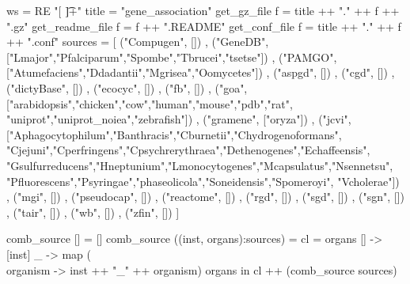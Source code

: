 \begin{code}
ws = RE "[ \t]+"
title = "gene_association"
get_gz_file f = title ++ "." ++ f ++ ".gz"
get_readme_file f = f ++ ".README"
get_conf_file f = title ++ "."  ++ f ++ ".conf"
\mbox{}
sources = [
	  ("Compugen", [])
	, ("GeneDB", ["Lmajor","Pfalciparum","Spombe","Tbrucei","tsetse"])
	, ("PAMGO", ["Atumefaciens","Ddadantii","Mgrisea","Oomycetes"])
	, ("aspgd", [])
	, ("cgd", [])
	, ("dictyBase", [])
	, ("ecocyc", [])
	, ("fb", [])
	, ("goa", ["arabidopsis","chicken","cow","human","mouse","pdb","rat",
                   "uniprot","uniprot_noiea","zebrafish"])
	, ("gramene", ["oryza"])
	, ("jcvi", ["Aphagocytophilum","Banthracis","Cburnetii","Chydrogenoformans",
                    "Cjejuni","Cperfringens","Cpsychrerythraea","Dethenogenes","Echaffeensis",
                    "Gsulfurreducens","Hneptunium","Lmonocytogenes","Mcapsulatus","Nsennetsu",
                    "Pfluorescens","Psyringae","phaseolicola","Soneidensis","Spomeroyi",
		    "Vcholerae"])
	, ("mgi", [])
	, ("pseudocap", [])
	, ("reactome", [])
	, ("rgd", [])
	, ("sgd", [])
	, ("sgn", [])
	, ("tair", [])
	, ("wb", [])
	, ("zfin", []) ]


comb_source [] = []
comb_source ((inst, organs):sources) = 
    cl =  organs 
	  [] -> [inst]
	  _ -> map (\\organism -> inst ++ "_" ++ organism) organs
   in cl ++ (comb_source sources) 

\end{code}

\begin{center}
\end{center}
